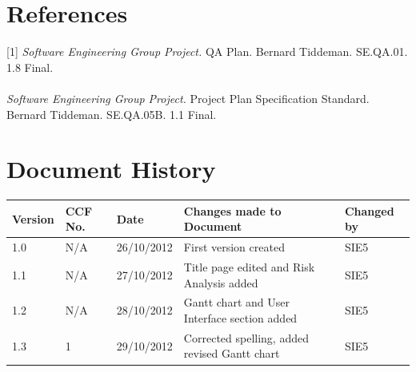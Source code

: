 \documentclass[a4paper]{article}
\begin{document}
\section{References}
[1] \textit{Software Engineering Group Project.} QA Plan.
Bernard Tiddeman. SE.QA.01. 1.8 Final. \\ \relax \\ \relax
[2] \textit{Software Engineering Group Project.} Project Plan Specification Standard.
Bernard Tiddeman. SE.QA.05B. 1.1 Final.
\clearpage
\section{Document History}
\begin{tabular}{|l | l | l | l | l |}
\hline
Version & CCF No. & Date & Changes made to Document & Changed by \\
\hline
1.0 & N/A & 26/10/2012 & First version created & SIE5\\
\hline
1.1 & N/A & 27/10/2012 & Title page edited and Risk Analysis added & SIE5\\
\hline
1.2 & N/A & 28/10/2012 & Gantt chart and User Interface section added & SIE5 \\
\hline
1.3 & 1 & 29/10/2012 & Corrected spelling, added revised Gantt chart & SIE5 \\
\hline
\end{tabular}
\end{document}
